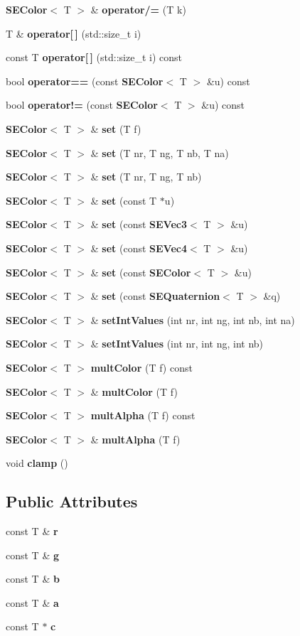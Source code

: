 \begin{DoxyCompactItemize}
\item 
{\bf S\+E\+Color}$<$ T $>$ \& {\bf operator/=} (T k)
\item 
T \& {\bf operator[$\,$]} (std\+::size\+\_\+t i)
\item 
const T {\bf operator[$\,$]} (std\+::size\+\_\+t i) const 
\item 
bool {\bf operator==} (const {\bf S\+E\+Color}$<$ T $>$ \&u) const 
\item 
bool {\bf operator!=} (const {\bf S\+E\+Color}$<$ T $>$ \&u) const 
\item 
{\bf S\+E\+Color}$<$ T $>$ \& {\bf set} (T f)
\item 
{\bf S\+E\+Color}$<$ T $>$ \& {\bf set} (T nr, T ng, T nb, T na)
\item 
{\bf S\+E\+Color}$<$ T $>$ \& {\bf set} (T nr, T ng, T nb)
\item 
{\bf S\+E\+Color}$<$ T $>$ \& {\bf set} (const T $\ast$u)
\item 
{\bf S\+E\+Color}$<$ T $>$ \& {\bf set} (const {\bf S\+E\+Vec3}$<$ T $>$ \&u)
\item 
{\bf S\+E\+Color}$<$ T $>$ \& {\bf set} (const {\bf S\+E\+Vec4}$<$ T $>$ \&u)
\item 
{\bf S\+E\+Color}$<$ T $>$ \& {\bf set} (const {\bf S\+E\+Color}$<$ T $>$ \&u)
\item 
{\bf S\+E\+Color}$<$ T $>$ \& {\bf set} (const {\bf S\+E\+Quaternion}$<$ T $>$ \&q)
\item 
{\bf S\+E\+Color}$<$ T $>$ \& {\bf set\+Int\+Values} (int nr, int ng, int nb, int na)
\item 
{\bf S\+E\+Color}$<$ T $>$ \& {\bf set\+Int\+Values} (int nr, int ng, int nb)
\item 
{\bf S\+E\+Color}$<$ T $>$ {\bf mult\+Color} (T f) const 
\item 
{\bf S\+E\+Color}$<$ T $>$ \& {\bf mult\+Color} (T f)
\item 
{\bf S\+E\+Color}$<$ T $>$ {\bf mult\+Alpha} (T f) const 
\item 
{\bf S\+E\+Color}$<$ T $>$ \& {\bf mult\+Alpha} (T f)
\item 
void {\bf clamp} ()
\end{DoxyCompactItemize}
\subsection*{Public Attributes}
\begin{DoxyCompactItemize}
\item 
const T \& {\bf r}
\item 
const T \& {\bf g}
\item 
const T \& {\bf b}
\item 
const T \& {\bf a}
\item 
const T $\ast$ {\bf c}
\end{DoxyCompactItemize}
